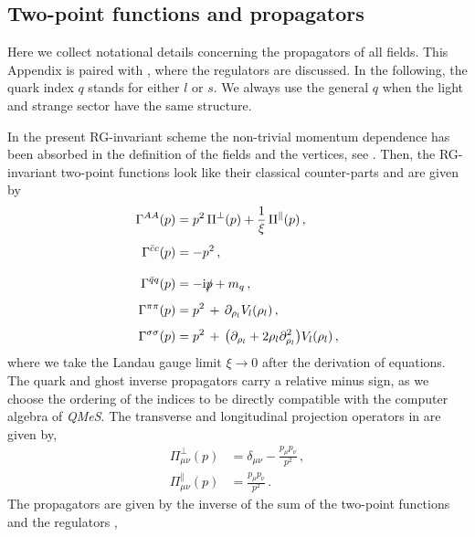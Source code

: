 \documentclass[aps,twocolumn,prd,superscriptaddress]{revtex4-2}
\begin{document}
	
\subsection{Two-point functions and propagators} 
\label{app:PropagatorsVertices}

Here we collect notational details concerning the propagators of all fields. This Appendix is paired with , where the regulators are discussed. In the following, the quark index $q$ stands for either $l$ or $s$. We always use the general $q$ when the light and strange sector have the same structure. 

In the present RG-invariant scheme the non-trivial momentum dependence has been absorbed in the definition of the fields and the vertices, see . Then, the RG-invariant two-point functions look like their classical counter-parts and are given by
%
\begin{align}\nonumber 
	\Gamma^{AA}(p)           & = p^2\,\Pi^\perp(p) + \frac{1}{\xi}\,\Pi^\parallel(p)\,,
	\\[1ex]\nonumber 
	\Gamma^{\bar{c}c}(p)     & = - p^2\,, 	\\[2ex]\nonumber 
		\Gamma^{\bar qq}(p)     & = - {\textrm{i}}\slashed{p} + m_q\,,\\[1ex]\nonumber   
	\Gamma^{\pi\pi}(p)       & = p^2\,+\,\partial_{\rho_l} V_l(\rho_l)\,,	\\[1ex]
	\Gamma^{\sigma\sigma}(p) & = p^2\,+\,\big(\partial_{\rho_l} + 2\rho_l\partial_{\rho_l}^2\big) V_l(\rho_l)\,,
\label{eq:inverseProps}
\end{align}
%	
where we take the Landau gauge limit $\xi \to 0$ after the derivation of equations. The quark and ghost inverse propagators carry a relative minus sign, as we choose the ordering of the indices to be directly compatible with the computer algebra of \textit{QMeS}. The transverse and longitudinal projection operators in  are given by,
%
\begin{align}\nonumber 
	\Pi_{\mu\nu}^\perp(p)     & = \delta_{\mu\nu} - \frac{p_\mu p_\nu}{p^2}\,,\\[1ex]
	\Pi_{\mu\nu}^\parallel(p) & = \frac{p_\mu p_\nu}{p^2}\,. 
	\label{eq:ProjectionOps}
\end{align}
%
The propagators are given by the inverse of the sum of the two-point functions  and the regulators 	, 
%
\end{document}
